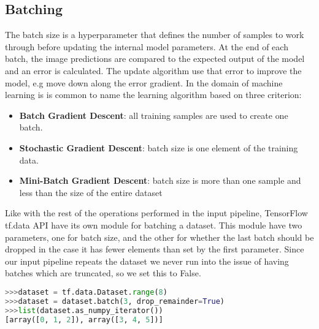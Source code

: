 \documentclass[thesis.tex]{subfiles}
\begin{document}
\subsection{Batching}
The batch size is a hyperparameter that defines the number of samples to work through before updating the internal model parameters. At the end of each batch, the image predictions are compared to the expected output of the model and an error is calculated. The update algorithm use that error to improve the model, e.g move down along the error gradient.
In the domain of machine learning is is common to name the learning algorithm based on three criterion:
\begin{itemize}
\item \textbf{Batch Gradient Descent}: all training samples are used to create one batch.
\item \textbf{Stochastic Gradient Descent}: batch size is one element of the training data.
\item \textbf{Mini-Batch Gradient Descent}: batch size is more than one sample and less than the size of the entire dataset
\end{itemize}

Like with the rest of the operations performed in the input pipeline, TensorFlow tf.data API have its own module for batching a dataset. This module have two parameters, one for batch size, and the other for whether the last batch should be dropped in the case it has fewer elements than set by the first parameter. Since our input pipeline repeats the dataset we never run into the issue of having batches which are truncated, so we set this to False.

\begin{lstlisting}[language=Python, caption={Notice how \text{[6, 7]} is missing because drop\_remainder is set to True.}, captionpos=b]
>>>dataset = tf.data.Dataset.range(8)
>>>dataset = dataset.batch(3, drop_remainder=True)
>>>list(dataset.as_numpy_iterator())
[array([0, 1, 2]), array([3, 4, 5])]
\end{lstlisting}
\end{document}
